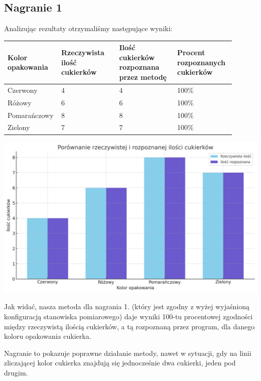 \documentclass{article}
\begin{document}
\subsection{Nagranie 1}
Analizując rezultaty otrzymaliśmy następujące wyniki:

\begin{center}
\begin{tabular}{|p{0.15\linewidth}|p{0.25\linewidth}|p{0.25\linewidth}|p{0.25\linewidth}|}
 \hline
 Kolor opakowania & Rzeczywista ilość cukierków & Ilość cukierków rozpoznana przez metodę & Procent rozpoznanych cukierków \\
 \hline
 Czerwony & 4 & 4 & 100\% \\
 \hline
 Różowy & 6 & 6 & 100\% \\
 \hline
 Pomarańczowy & 8 & 8 & 100\% \\
 \hline
 Zielony & 7 & 7 & 100\% \\
 \hline
\end{tabular}
\end{center}

\begin{center}
\includegraphics[width=\linewidth]{wykres1.png}
\end{center}

Jak widać, nasza metoda dla nagrania 1. (który jest zgodny z wyżej wyjaśnioną konfiguracją stanowiska pomiarowego) daje wyniki 100-tu procentowej zgodności między rzeczywistą ilością cukierków, a tą rozpoznaną przez program, dla danego koloru opakowania cukierka.

Nagranie to pokazuje poprawne działanie metody, nawet w sytuacji, gdy na linii zliczającej kolor cukierka znajdują się jednocześnie dwa cukierki, jeden pod drugim.
\end{document}
